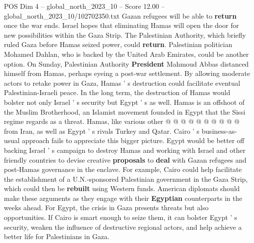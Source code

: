 \begin{textsample}{POS Dim 4 – global\_north\_2023\_10 – Score 12.00 – global\_north\_2023\_10/102702350.txt}
Gazan refugees will be able to \textbf{return} once the war ends.
Israel hopes that eliminating Hamas will open the door for new possibilities within the Gaza Strip.
The Palestinian Authority, which briefly ruled Gaza before Hamas seized power, could \textbf{return}.
Palestinian politician Mohamed Dahlan, who is backed by the United Arab Emirates, could be another option.
On Sunday, Palestinian Authority \textbf{President} Mahmoud Abbas distanced himself from Hamas, perhaps eyeing a post-war settlement.
By allowing moderate actors to retake power in Gaza, Hamas ' s destruction could facilitate eventual Palestinian-Israeli peace.
In the long term, the destruction of Hamas would bolster not only Israel ' s security but Egypt ' s as well.
Hamas is an offshoot of the Muslim Brotherhood, an Islamist movement founded in Egypt that the Sissi regime regards as a threat.
Hamas, like various other @ @ @ @ @ @ @ @ @ @ from Iran, as well as Egypt ' s rivals Turkey and Qatar.
Cairo ' s business-as-usual approach fails to appreciate this bigger picture.
Egypt would be better off backing Israel ' s campaign to destroy Hamas and working with Israel and other friendly countries to devise creative \textbf{proposals} to \textbf{deal} with Gazan refugees and post-Hamas governance in the enclave.
For example, Cairo could help facilitate the establishment of a U.N.-sponsored Palestinian government in the Gaza Strip, which could then be \textbf{rebuilt} using Western funds.
American diplomats should make these arguments as they engage with their \textbf{Egyptian} counterparts in the weeks ahead.
For Egypt, the crisis in Gaza presents threats but also opportunities.
If Cairo is smart enough to seize them, it can bolster Egypt ' s security, weaken the influence of destructive regional actors, and help achieve a better life for Palestinians in Gaza.

\end{textsample}

